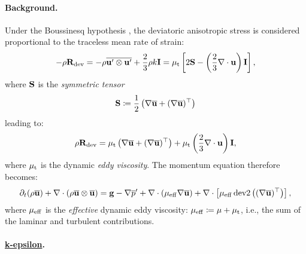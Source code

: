 \documentclass{article}
\numberwithin{equation}{section}
\begin{document}
\paragraph{Background.} Under the Boussinesq hypothesis \cite{Boussinesq1877}, the deviatoric anisotropic stress is considered proportional to the traceless mean rate of strain:
\begin{align*}
	-\rho{\bf R}_{\rm dev} = -\rho\overline{{\bf u}'\otimes{\bf u}'} + \frac{2}{3}\rho k{\bf I} = \mu_{\rm t}\left[2{\bf S} - \left(\frac{2}{3}\nabla\cdot{\bf u}\right){\bf I}\right],
\end{align*}
where ${\bf S}$ is the \textit{symmetric tensor}
\begin{align*}
	{\bf S}\coloneqq\frac{1}{2}\left(\nabla\overline{\bf u} + (\nabla\overline{\bf u})^\top\right)
\end{align*}
leading to:
\begin{align*}
	\rho{\bf R}_{\rm dev} = \mu_{\rm t}\left(\nabla\overline{\bf u} + (\nabla\overline{\bf u})^\top\right) + \mu_{\rm t}\left(\frac{2}{3}\nabla\cdot{\bf u}\right){\bf I},
\end{align*}
where $\mu_{\rm t}$ is the dynamic \emph{eddy viscosity}. The momentum equation therefore becomes:
\begin{align*}
	\partial_t(\rho\overline{\bf u}) + \nabla\cdot(\rho\overline{\bf u}\otimes\overline{\bf u}) = {\bf g} - \nabla\overline{p}' + \nabla\cdot(\mu_{\rm eff}\nabla\overline{\bf u}) + \nabla\cdot\left[\mu_{\rm eff}\operatorname{dev2}\left((\nabla\overline{\bf u})^\top\right)\right],
\end{align*}
where $\mu_{\rm eff}$ is the \textit{effective} dynamic eddy viscosity: $\mu_{\rm eff}\coloneqq\mu + \mu_{\rm t}$, i.e., the sum of the laminar and turbulent contributions.

\paragraph{\href{https://www.openfoam.com/documentation/guides/latest/doc/guide-turbulence-ras-k-epsilon.html}{k-epsilon}.}
\end{document}
